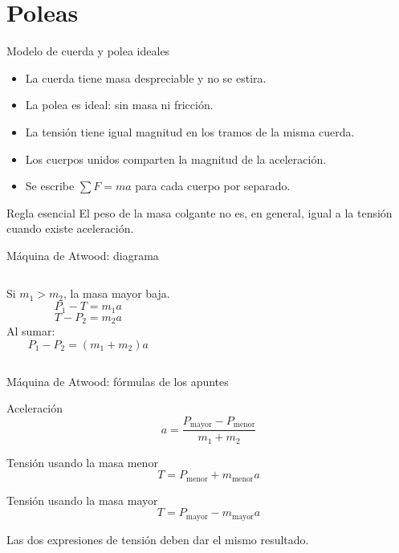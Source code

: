 \documentclass[aspectratio=169,11pt]{beamer}
\begin{document}
\section{Poleas}
\begin{frame}{Modelo de cuerda y polea ideales}
\begin{itemize}
\item La cuerda tiene masa despreciable y no se estira.
\item La polea es ideal: sin masa ni fricción.
\item La tensión tiene igual magnitud en los tramos de la misma cuerda.
\item Los cuerpos unidos comparten la magnitud de la aceleración.
\item Se escribe \(\sum F=ma\) para cada cuerpo por separado.
\end{itemize}
\begin{alertblock}{Regla esencial}
El peso de la masa colgante no es, en general, igual a la tensión cuando existe aceleración.
\end{alertblock}
\end{frame}
\begin{frame}{Máquina de Atwood: diagrama}
\begin{columns}
\centering
{}
Si \(m_1>m_2\), la masa mayor baja.
\[P_1-T=m_1a\]
\[T-P_2=m_2a\]
Al sumar:
\[P_1-P_2=(m_1+m_2)a\]
\end{columns}
\end{frame}
\begin{frame}{Máquina de Atwood: fórmulas de los apuntes}
\begin{block}{Aceleración}
\[\boxed{a=\frac{P_{\mathrm{mayor}}-P_{\mathrm{menor}}}{m_1+m_2}}\]
\end{block}
\begin{block}{Tensión usando la masa menor}
\[\boxed{T=P_{\mathrm{menor}}+m_{\mathrm{menor}}a}\]
\end{block}
\begin{block}{Tensión usando la masa mayor}
\[\boxed{T=P_{\mathrm{mayor}}-m_{\mathrm{mayor}}a}\]
\end{block}
Las dos expresiones de tensión deben dar el mismo resultado.
\end{frame}
\end{document}
